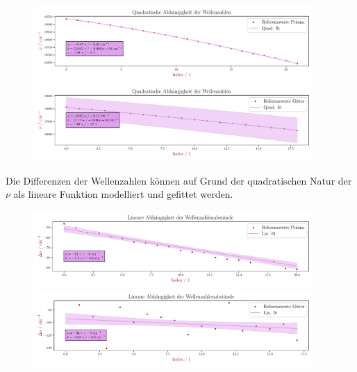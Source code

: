 \documentclass[12pt,english,ngerman]{scrartcl}
\begin{document}
\begin{figure}[H]
	\begin{center}
		\includegraphics[width=0.95\textwidth]{figures/waveNumberFitPrisma.pdf}
		\includegraphics[width=0.95\textwidth]{figures/waveNumberFitGitter.pdf}
	\end{center}
	\caption{}\label{fig:wellenZahlenFit}

\end{figure}

Die Differenzen der Wellenzahlen können auf Grund der quadratischen Natur der
$\nu$ als lineare Funktion modelliert und gefittet werden.

\begin{figure}[H]
	\begin{center}
		\includegraphics[width=0.95\textwidth]{figures/waveNumberDeltasFitPrisma.pdf}
		\includegraphics[width=0.95\textwidth]{figures/waveNumberDeltasFitGitter.pdf}
	\end{center}
	\caption{}\label{fig:wellenZahlenDeltaFit}

\end{figure}
\end{document}
